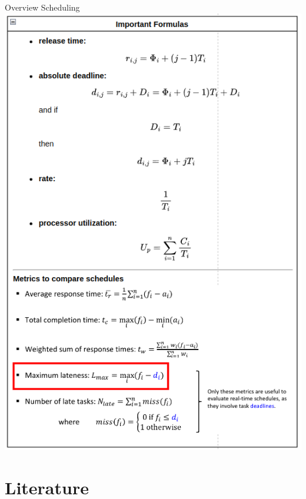 \begin{frame}[allowframebreaks]{Overview Scheduling}
  \includegraphics[height=0.7\paperheight]{./figures/important_formulas.png}

\end{frame}







\section{Literature}


